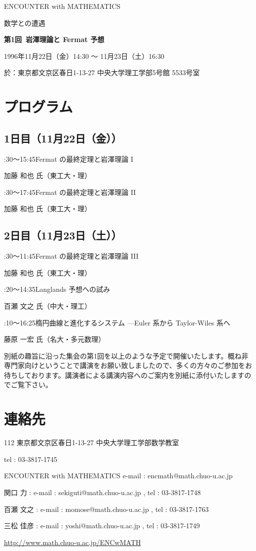 \documentclass[uplatex,dvipdfmx]{jlreq}
\newcommand{\talk}[3]{%
\noindent
#1\quad #2\par
\hspace*{2em}#3\par\smallskip
}
\newcommand{\EwMnumber}{第1回}
\newcommand{\EwMtitle}{岩澤理論と Fermat 予想}
\newcommand{\EwMdate}{1996年11月22日（金）14:30 ～ 11月23日（土）16:30}
\newcommand{\EwMplace}{東京都文京区春日1-13-27 中央大学理工学部5号館 5533号室}
\newcommand{\EwMtitleblock}{

\vspace*{-5mm}

\begin{center}

{\Large ENCOUNTER with MATHEMATICS}

\vspace{2mm}

{\large 数学との遭遇}

\vspace{4mm}

{\Large \bfseries \EwMnumber\ \EwMtitle}

\vspace{4mm}

\EwMdate

\vspace{2mm}

於：\EwMplace

\end{center}

\vspace{3mm}

\vspace{2mm}

}
\begin{document}
\EwMtitleblock


\section*{プログラム}

\subsection*{1日目（11月22日（金））}

\talk
{14:30～15:45}
{Fermat の最終定理と岩澤理論 I}
{加藤 和也 氏（東工大・理）}

\talk
{16:30～17:45}
{Fermat の最終定理と岩澤理論 II}
{加藤 和也 氏（東工大・理）}

\subsection*{2日目（11月23日（土））}

\talk
{10:30～11:45}
{Fermat の最終定理と岩澤理論 III}
{加藤 和也 氏（東工大・理）}

\talk
{13:20～14:35}
{Langlands 予想への試み}
{百瀬 文之 氏（中大・理工）}

\talk
{15:10～16:25}
{楕円曲線と進化するシステム —Euler 系から Taylor-Wiles 系へ}
{藤原 一宏 氏（名大・多元数理）}


\bigskip

別紙の趣旨に沿った集会の第1回を以上のような予定で開催いたします。概ね非専門家向けということで講演をお願い致しましたので、多くの方々のご参加をお待ちしております。講演者による講演内容へのご案内を別紙に添付いたしますのでご覧下さい。


\section*{連絡先}

112 東京都文京区春日1-13-27 中央大学理工学部数学教室

tel : 03-3817-1745

ENCOUNTER with MATHEMATICS  
e-mail : encmath@math.chuo-u.ac.jp  

関口 力 : e-mail : sekiguti@math.chuo-u.ac.jp , tel : 03-3817-1748  

百瀬 文之 : e-mail : momose@math.chuo-u.ac.jp , tel : 03-3817-1763  

三松 佳彦 : e-mail : yoshi@math.chuo-u.ac.jp , tel : 03-3817-1749  

\url{http://www.math.chuo-u.ac.jp/ENCwMATH}
\end{document}
